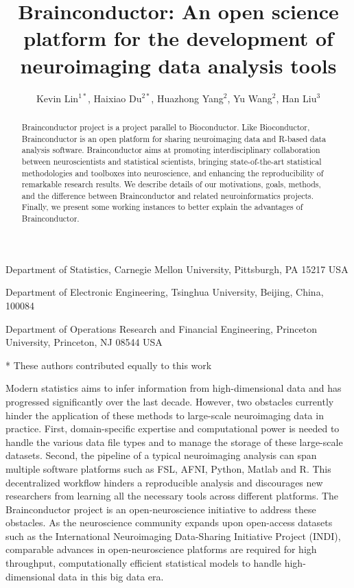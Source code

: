 \documentclass{nature}
\title{Brainconductor: An open science platform for the development of
neuroimaging
data analysis tools}
\author{Kevin Lin$^{1*}$, Haixiao Du$^{2*}$, Huazhong
Yang$^2$, Yu Wang$^2$, Han Liu$^3$}
\begin{document}
\maketitle



\begin{affiliations}
\item Department of Statistics, Carnegie Mellon University,
Pittsburgh, PA 15217 USA
\item Department of Electronic Engineering, Tsinghua University, Beijing, China,
100084
\item Department of Operations Research and Financial Engineering, Princeton
University, Princeton, NJ 08544 USA
\item[*] These authors contributed equally to this work
\end{affiliations}

\begin{abstract}
    Brainconductor project is a project parallel to Bioconductor. Like
Bioconductor, Brainconductor is an open platform for sharing neuroimaging data
and R-based data analysis software. Brainconductor aims at promoting
interdisciplinary collaboration between neuroscientists and
statistical scientists, bringing state-of-the-art statistical methodologies and
toolboxes into neuroscience, and enhancing the reproducibility of remarkable
research results. We describe details of our motivations, goals, methods, and
the difference between Brainconductor and related neuroinformatics projects.
Finally, we present some working instances to better explain the advantages of
Brainconductor.
\end{abstract}


Modern statistics aims to infer information from high-dimensional data
and has progressed significantly over the last decade.
However, two obstacles currently hinder the
application of these methods to large-scale neuroimaging data
in practice.
First, domain-specific expertise and computational power is needed to handle
the various data file types and to manage the storage
of these large-scale datasets. Second, the pipeline of a typical
neuroimaging analysis can span multiple software platforms such as FSL, AFNI,
Python, Matlab and R. This decentralized workflow hinders a reproducible 
analysis and discourages new researchers from learning all the
necessary tools across different platforms.
The Brainconductor project is an open-neuroscience
initiative to address
these obstacles.
As the neuroscience community expands upon open-access
datasets such as the  International Neuroimaging Data-Sharing
Initiative Project (INDI), comparable advances in
open-neuroscience platforms are required
for high
throughput, computationally efficient statistical models
to handle high-dimensional data in this big data era.
\end{document}
